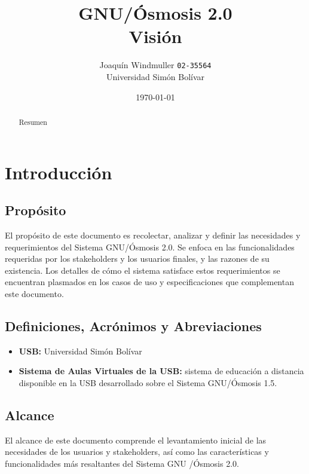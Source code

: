 \documentclass{article}
\begin{document}
\title{GNU/Ósmosis 2.0 \\ Visión}
\author{Joaquín Windmuller \texttt{02-35564} \\
		Universidad Simón Bolívar}
\date{\today}  %
\maketitle

\begin{abstract}
	Resumen
\end{abstract}

\pagebreak
\tableofcontents
\pagebreak

\section{Introducción}
	\subsection{Propósito}
	El propósito de este documento es recolectar, analizar y definir las necesidades y requerimientos del Sistema GNU/Ósmosis 2.0. Se enfoca en las funcionalidades requeridas por los stakeholders y los usuarios finales, y las razones de su existencia. Los detalles de cómo el sistema satisface estos requerimientos se encuentran plasmados en los casos de uso y especificaciones que complementan este documento.

	\subsection{Definiciones, Acrónimos y Abreviaciones}	
		\begin{itemize}
			\item \textbf{USB:} Universidad Simón Bolívar
			\item \textbf{Sistema de Aulas Virtuales de la USB:} sistema de educación a distancia disponible en la USB desarrollado sobre el Sistema GNU/Ósmosis 1.5.
		\end{itemize}
	
	\subsection{Alcance}
	El alcance de este documento comprende el levantamiento inicial de las necesidades de los usuarios y stakeholders, así como las características y funcionalidades más resaltantes del Sistema GNU /Ósmosis 2.0.
	
\end{document}
